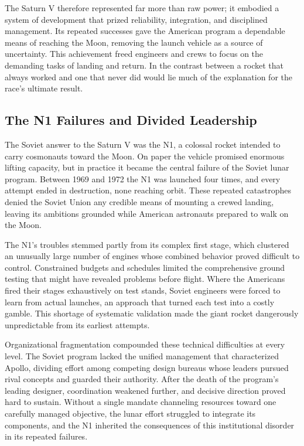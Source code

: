 The Saturn V therefore represented far more than raw power; it embodied a system of development that prized reliability, integration, and disciplined management. Its repeated successes gave the American program a dependable means of reaching the Moon, removing the launch vehicle as a source of uncertainty. This achievement freed engineers and crews to focus on the demanding tasks of landing and return. In the contrast between a rocket that always worked and one that never did would lie much of the explanation for the race's ultimate result. \cite{chaikin1994} \cite{logsdon2010}

\subsection{The N1 Failures and Divided Leadership}
The Soviet answer to the Saturn V was the N1, a colossal rocket intended to carry cosmonauts toward the Moon. On paper the vehicle promised enormous lifting capacity, but in practice it became the central failure of the Soviet lunar program. Between 1969 and 1972 the N1 was launched four times, and every attempt ended in destruction, none reaching orbit. These repeated catastrophes denied the Soviet Union any credible means of mounting a crewed landing, leaving its ambitions grounded while American astronauts prepared to walk on the Moon.

The N1's troubles stemmed partly from its complex first stage, which clustered an unusually large number of engines whose combined behavior proved difficult to control. Constrained budgets and schedules limited the comprehensive ground testing that might have revealed problems before flight. Where the Americans fired their stages exhaustively on test stands, Soviet engineers were forced to learn from actual launches, an approach that turned each test into a costly gamble. This shortage of systematic validation made the giant rocket dangerously unpredictable from its earliest attempts.

Organizational fragmentation compounded these technical difficulties at every level. The Soviet program lacked the unified management that characterized Apollo, dividing effort among competing design bureaus whose leaders pursued rival concepts and guarded their authority. After the death of the program's leading designer, coordination weakened further, and decisive direction proved hard to sustain. Without a single mandate channeling resources toward one carefully managed objective, the lunar effort struggled to integrate its components, and the N1 inherited the consequences of this institutional disorder in its repeated failures.

